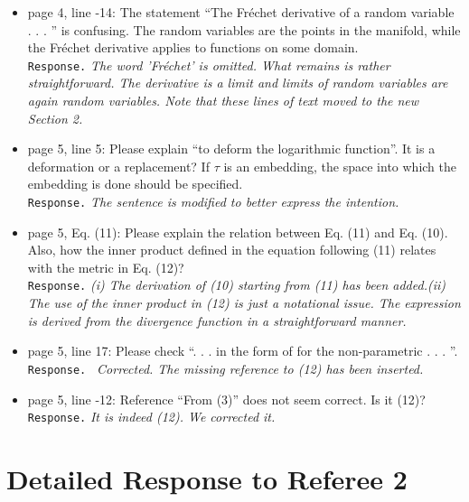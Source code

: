 \documentclass[a4paper,12pt]{article}
\begin{document}
\begin{itemize}
\item page 4, line -14: The statement “The Fr\'echet derivative of a random
variable . . . ” is confusing. The random variables are the points in the
manifold, while the Fr\'echet derivative applies to functions on some domain. \\
{\tt Response.} {\it The word 'Fr\'echet' is omitted. What remains is rather straightforward.
 The derivative is a limit and limits of random variables are again random variables.
 Note that these lines of text moved to the new Section 2.}

\item page 5, line 5: Please explain “to deform the logarithmic function”. It
is a deformation or a replacement? If $\tau$ is an embedding, the space into
which the embedding is done should be specified. \\
{\tt Response.} {\it The sentence is modified to better express the intention.}

\item page 5, Eq. (11): Please explain the relation between Eq. (11) and Eq.
(10). Also, how the inner product defined in the equation following (11)
relates with the metric in Eq. (12)? \\
{\tt Response.} {\it (i) The derivation of (10) starting from (11) has been added.(ii) The use of the inner product in (12) is just a notational issue.
 The expression is derived from the divergence function in a straightforward manner.}

\item page 5, line 17: Please check “. . . in the form of for the non-parametric
. . . ”. \\
{\tt Response. } {\it Corrected. The missing reference to (12) has been inserted.}

\item page 5, line -12: Reference “From (3)” does not seem correct. Is it (12)? \\
{\tt Response.} {\it It is indeed (12). We corrected it.}

\end{itemize}
\section{Detailed Response to Referee 2}
\end{document}
